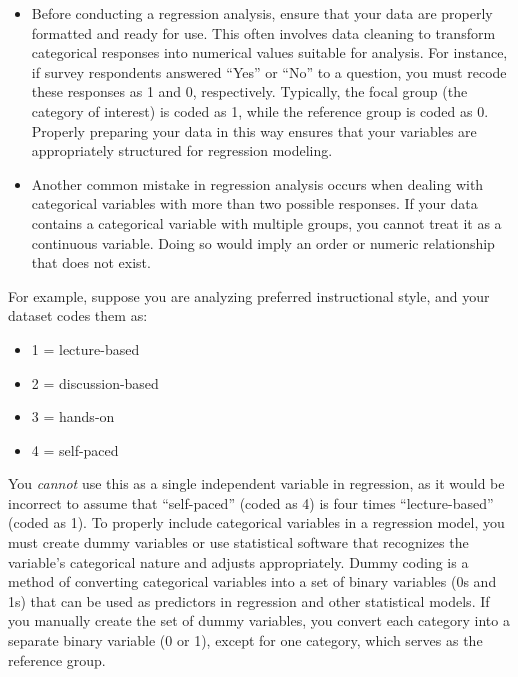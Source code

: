 \documentclass[
  letterpaper,
  DIV=11,
  numbers=noendperiod]{scrreprt}
\begin{document}
\begin{itemize}
  \begin{itemize}
  \item
    Before conducting a regression analysis, ensure that your data are
    properly formatted and ready for use. This often involves data
    cleaning to transform categorical responses into numerical values
    suitable for analysis. For instance, if survey respondents answered
    ``Yes'' or ``No'' to a question, you must recode these responses as
    1 and 0, respectively. Typically, the focal group (the category of
    interest) is coded as 1, while the reference group is coded as 0.
    Properly preparing your data in this way ensures that your variables
    are appropriately structured for regression modeling.
  \item
    Another common mistake in regression analysis occurs when dealing
    with categorical variables with more than two possible responses. If
    your data contains a categorical variable with multiple groups, you
    cannot treat it as a continuous variable. Doing so would imply an
    order or numeric relationship that does not exist.
  \end{itemize}
\end{itemize}

For example, suppose you are analyzing preferred instructional style,
and your dataset codes them as:

\begin{itemize}
\item
  1 = lecture-based
\item
  2 = discussion-based
\item
  3 = hands-on
\item
  4 = self-paced
\end{itemize}

You \emph{cannot} use this as a single independent variable in
regression, as it would be incorrect to assume that ``self-paced''
(coded as 4) is four times ``lecture-based'' (coded as 1). To properly
include categorical variables in a regression model, you must create
dummy variables or use statistical software that recognizes the
variable's categorical nature and adjusts appropriately. Dummy coding is
a method of converting categorical variables into a set of binary
variables (0s and 1s) that can be used as predictors in regression and
other statistical models. If you manually create the set of dummy
variables, you convert each category into a separate binary variable (0
or 1), except for one category, which serves as the reference group.
\end{document}
